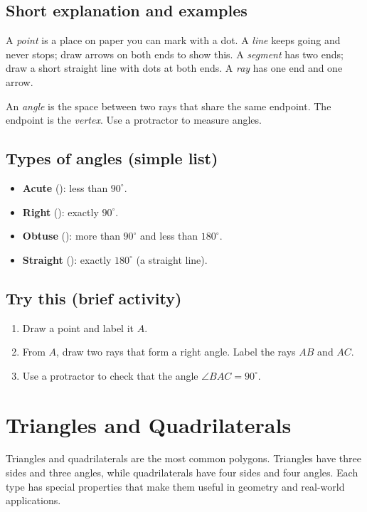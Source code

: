 \subsection{Short explanation and examples}

A \emph{point} is a place on paper you can mark with a dot. A \emph{line} keeps
going and never stops; draw arrows on both ends to show this. A \emph{segment} has
two ends; draw a short straight line with dots at both ends. A \emph{ray} has one
end and one arrow.

An \emph{angle} is the space between two rays that share the same endpoint. The
endpoint is the \emph{vertex}. Use a protractor to measure angles.

\subsection{Types of angles (simple list)}

\begin{itemize}
  \item \textbf{Acute} (): less than \(90^\circ\).
  \item \textbf{Right} (): exactly \(90^\circ\).
  \item \textbf{Obtuse} (): more than \(90^\circ\) and less than \(180^\circ\).
  \item \textbf{Straight} (): exactly \(180^\circ\) (a straight line).
\end{itemize}

\subsection{Try this (brief activity)}

\begin{enumerate}
  \item Draw a point and label it \(A\).
  \item From \(A\), draw two rays that form a right angle. Label the rays \(AB\) and \(AC\).
  \item Use a protractor to check that the angle \( \angle BAC = 90^\circ\).
\end{enumerate}


\section{Triangles and Quadrilaterals}

Triangles and quadrilaterals are the most common polygons. Triangles have three
sides and three angles, while quadrilaterals have four sides and four angles.
Each type has special properties that make them useful in geometry and real-world
applications.

